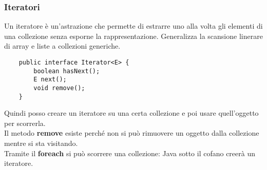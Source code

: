 \subsubsection{Iteratori}
Un iteratore è un'astrazione che permette di estrarre uno alla volta gli elementi di una collezione senza esporne la rappresentazione. Generalizza la scansione linerare di array e liste a collezioni generiche.
\begin{lstlisting}
	public interface Iterator<E> {
		boolean hasNext();
		E next();
		void remove();
	}
\end{lstlisting}
Quindi posso creare un iteratore su una certa collezione e poi usare quell'oggetto per scorrerla.\\
Il metodo \textbf{remove} esiste perché non si può rimuovere un oggetto dalla collezione mentre si sta visitando.\\
Tramite il \textbf{foreach} si può scorrere una collezione: Java sotto il cofano creerà un iteratore.